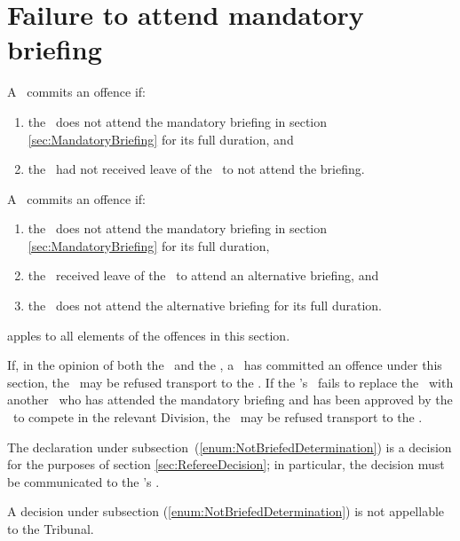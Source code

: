 \documentclass[12pt]{report}
\begin{document}
    \section{Failure to attend mandatory briefing}
    \begin{fenumerate}
      \item A \competitor\ commits an offence if:
      \begin{enumerate}
        \item the \competitor\ does not attend the mandatory briefing  in section \ref{sec:MandatoryBriefing} for its full duration, and
        \item the \competitor\ had not received leave of the \RaceDirector\ to not attend the briefing.
      \end{enumerate}
      \item A \competitor\ commits an offence if:
      \begin{enumerate}
        \item the \competitor\ does not attend the mandatory briefing in section \ref{sec:MandatoryBriefing} for its full duration,
        \item the \competitor\ received leave of the \RaceDirector\ to attend an alternative briefing, and
        \item the \competitor\ does not attend the alternative briefing for its full duration.
      \end{enumerate}
      \item {} apples to all elements of the offences in this section.
      \item If, in the opinion of both the \Referee\ and the \RaceDirector, a \competitor\ has committed an offence under this section, the \competitor\ may be refused transport to the \dropoffpoint. If the \competitor's \team\ fails to replace the \competitor\ with another \competitor\ who has attended the mandatory briefing and has been approved by the \RaceDirector\ to compete in the relevant Division, the \team\ may be refused transport to the \dropoffpoint.\label{enum:NotBriefedDetermination}
      \item The declaration under subsection~\thesection(\ref{enum:NotBriefedDetermination}) is a decision for the purposes of section \ref{sec:RefereeDecision}; in particular, the decision must be communicated to the \team's \Captain.
    \item A decision under subsection \thesection(\ref{enum:NotBriefedDetermination}) is not appellable to the Tribunal.
    \end{fenumerate}\amended
\end{document}
